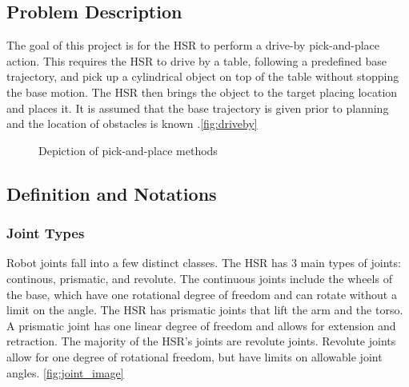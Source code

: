 \documentclass[12pt]{article}
\begin{document}
    \subsection{Problem Description}
        The goal of this project is for the HSR to perform a drive-by pick-and-place action. This requires the HSR to drive by a table, following a predefined base trajectory, and pick up a cylindrical object on top of the table without stopping the base motion. The HSR then brings the object to the target placing location and places it. It is assumed that the base trajectory is given prior to planning and the location of obstacles is known .\cref{fig:driveby}
        \begin{figure}[ht]
            \centering
            \quad
            \caption{Depiction of pick-and-place methods}
            \label{fig:base_roll_fig}
        \end{figure}

    
    \subsection{Definition and Notations}

        \subsubsection{Joint Types}
            Robot joints fall into a few distinct classes. The HSR has 3 main types of joints: continous, prismatic, and revolute. The continuous joints include the wheels of the base, which have one rotational degree of freedom and can rotate without a limit on the angle. The HSR has prismatic joints that lift the arm and the torso. A prismatic joint has one linear degree of freedom and allows for extension and retraction. The majority of the HSR's joints are revolute joints. Revolute joints allow for one degree of rotational freedom, but have limits on allowable joint angles.\cite{lavalle_planning_2006} \cref{fig:joint_image}
\end{document}
